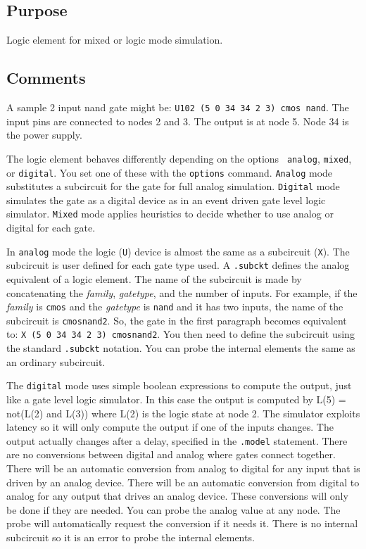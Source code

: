 \subsection{Purpose}

Logic element for mixed or logic mode simulation.
\subsection{Comments}

A sample 2 input nand gate might be: {\tt U102 (5 0 34 34 2 3) cmos nand}.
The input pins are connected to nodes 2 and 3.  The output is
at node 5.  Node 34 is the power supply.

The logic element behaves differently depending on the options {\tt
analog}, {\tt mixed}, or {\tt digital}.  You set one of these with the
{\tt options} command.  {\tt Analog} mode substitutes a subcircuit for
the gate for full analog simulation.  {\tt Digital} mode simulates the
gate as a digital device as in an event driven gate level logic
simulator.  {\tt Mixed} mode applies heuristics to decide whether to
use analog or digital for each gate.

In {\tt analog} mode the logic ({\tt U}) device is almost the same as
a subcircuit ({\tt X}).  The subcircuit is user defined for each gate
type used.  A {\tt .subckt} defines the analog equivalent of a logic
element.  The name of the subcircuit is made by concatenating the {\em
family}, {\em gatetype}, and the number of inputs.  For example, if
the {\em family} is {\tt cmos} and the {\em gatetype} is {\tt nand}
and it has two inputs, the name of the subcircuit is {\tt cmosnand2}.
So, the gate in the first paragraph becomes equivalent to: 
{\tt X (5 0 34 34 2 3) cmosnand2}.  You then need to define the
subcircuit using the standard {\tt .subckt} notation.  You can probe
the internal elements the same as an ordinary subcircuit.

The {\tt digital} mode uses simple boolean expressions to compute the
output, just like a gate level logic simulator.  In this case the
output is computed by L(5) = not(L(2) and L(3)) where L(2) is the
logic state at node 2.  The simulator exploits latency so it will only
compute the output if one of the inputs changes.  The output actually
changes after a delay, specified in the {\tt .model} statement.  There
are no conversions between digital and analog where gates connect
together.  There will be an automatic conversion from analog to
digital for any input that is driven by an analog device.  There will
be an automatic conversion from digital to analog for any output that
drives an analog device.  These conversions will only be done if they
are needed.  You can probe the analog value at any node.  The probe
will automatically request the conversion if it needs it.  There is no
internal subcircuit so it is an error to probe the internal elements.

